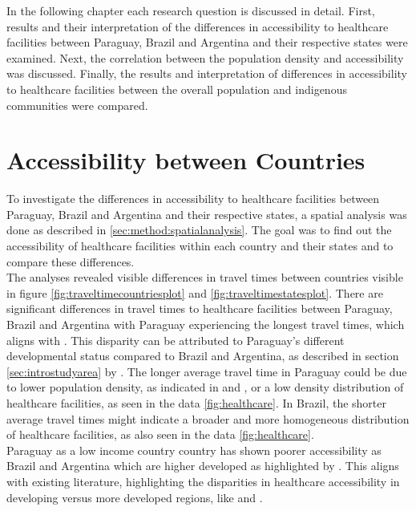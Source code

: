 \documentclass[11pt, a4paper]{report}
\begin{document}

In the following chapter each research question is discussed in detail. First, results and their interpretation of the differences in accessibility to healthcare facilities between Paraguay, Brazil and Argentina and their respective states were examined. Next, the correlation between the population density and accessibility was discussed. Finally, the results and interpretation of differences in accessibility to healthcare facilities between the overall population and indigenous communities were compared.


\section{Accessibility between Countries}

To investigate the differences in accessibility to healthcare facilities between Paraguay, Brazil and Argentina and their respective states, a spatial analysis was done as described in \ref{sec:method:spatialanalysis}. The goal was to find out the accessibility of healthcare facilities within each country and their states and to compare these differences. \\
%
The analyses revealed visible differences in travel times between countries visible in figure \ref{fig:traveltimecountriesplot} and \ref{fig:traveltimestatesplot}. There are significant differences in travel times to healthcare facilities between Paraguay, Brazil and Argentina with Paraguay experiencing the longest travel times, which aligns with \cite{gbd_2016_healthcare_access_and_quality_collaborators_measuring_2018}. This disparity can be attributed to Paraguay's different developmental status compared to Brazil and Argentina, as described in section \ref{sec:introstudyarea} by \cite{world_bank_world_2022}. The longer average travel time in Paraguay could be due to lower population density, as indicated in \citet{european_commission_joint_research_centre_global_2021} and \cite{united_nations_world_2022}, or a low density distribution of healthcare facilities, as seen in the data \ref{fig:healthcare}. In Brazil, the shorter average travel times might indicate a broader and more homogeneous distribution of healthcare facilities, as also seen in the data \ref{fig:healthcare}. \\
%
Paraguay as a low income country country has shown poorer accessibility as Brazil and Argentina which are higher developed as highlighted by \cite{world_bank_world_2022}. This aligns with existing literature, highlighting the disparities in healthcare accessibility in developing versus more developed regions, like \cite{mcintyre_access_2009} and \cite{de_siqueira_filha_economics_2022}. \\
\end{document}
